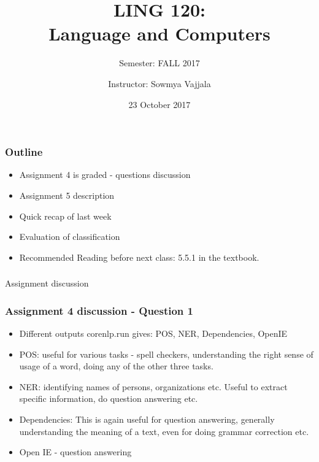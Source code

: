 \documentclass{beamer}
\author[Sowmya Vajjala]{Instructor: Sowmya Vajjala}
\title[LING 120]{LING 120: \\ Language and Computers}
\subtitle{Semester: FALL 2017}
\date{23 October 2017}
\institute{Iowa State University, USA}
\begin{document}
\begin{frame}\titlepage
\end{frame}

\begin{frame}
\frametitle{Outline}
\begin{itemize}
\item Assignment 4 is graded  - questions discussion %
\item Assignment 5 description %
\item Quick recap of last week %
\item Evaluation of classification %
\item Recommended Reading before next class: 5.5.1 in the textbook.
\end{itemize}
\end{frame}

\begin{frame}
\frametitle{}
\begin{center}
\Large Assignment discussion
\end{center}
\end{frame}


\begin{frame}
\frametitle{Assignment 4 discussion - Question 1}
\begin{itemize}
\item Different outputs corenlp.run gives: POS, NER, Dependencies, OpenIE
\item POS: useful for various tasks - spell checkers, understanding the right sense of usage of a word, doing any of the other three tasks.
\item NER: identifying names of persons, organizations etc. Useful to extract specific information, do question answering etc.
\item Dependencies: This is again useful for question answering, generally understanding the meaning of a text, even for doing grammar correction etc. 
\item Open IE - question answering
\end{itemize}
\end{frame}
\end{document}
